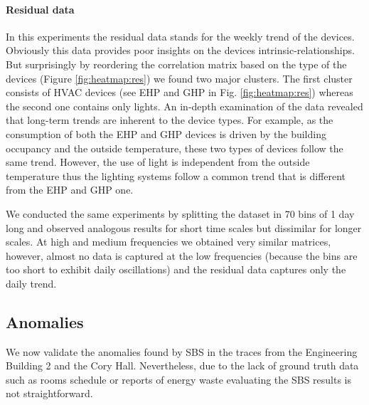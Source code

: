 \paragraph{Residual data}
In this experiments the residual data stands for the weekly trend of the devices.
Obviously this data provides poor insights on the devices intrinsic-relationships.
But surprisingly by reordering the correlation matrix based on the type of the devices (Figure \ref{fig:heatmap:res}) we found two major clusters.
The first cluster consists of HVAC devices (see EHP and GHP in Fig. \ref{fig:heatmap:res}) whereas the second one contains only lights. 
An in-depth examination of the data revealed that long-term trends are inherent to the device types. 
For example, as the consumption of both the EHP and GHP devices is driven by the building occupancy and the outside temperature, these two types of devices follow the same trend. 
However, the use of light is independent from the outside temperature thus the lighting systems follow a common trend that is different from the EHP and GHP one.

We conducted the same experiments by splitting the dataset in 70 bins of 1 day long and observed analogous results for short time scales but dissimilar for longer scales.
At high and medium frequencies we obtained very similar matrices, however, almost no data is captured at the low frequencies (because the bins are too short to exhibit daily oscillations) and the residual data captures only the daily trend.


\subsection{Anomalies}
We now validate the anomalies found by SBS in the traces from the Engineering Building 2 and the Cory Hall.
Nevertheless, due to the lack of ground truth data such as rooms schedule or reports of energy waste evaluating the SBS results is not straightforward.

